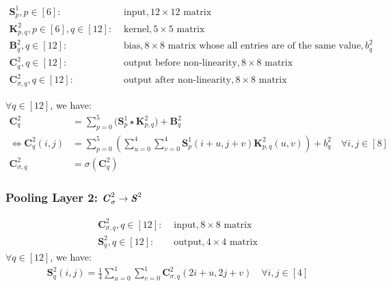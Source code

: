 \documentclass[12pt]{article}
\begin{document}
\begin{align*}
    \bm{S}^1_p, p \in [6]:& \text{ input}, 12 \times 12 \text{ matrix}\\
    \bm{K}^2_{p, q}, p \in [6], q \in [12]:& \text{ kernel}, 5 \times 5 \text{ matrix}\\
    \bm{B}^2_q, q \in [12]:& \text{ bias}, 8 \times 8 \text{ matrix whose all entries are of the same value}, b^2_q\\
    \bm{C}^2_q, q \in [12]:& \text{ output before non-linearity}, 8 \times 8 \text{ matrix}\\
    \bm{C}^2_{\sigma, q}, q \in [12]:& \text{ output after non-linearity}, 8 \times 8 \text{ matrix}
\end{align*}

$\forall q \in [12]$, we have:
\begin{align*}
    \bm{C}^2_q &= \sum_{p = 0}^5\Big(\bm{S}^1_p \star  \bm{K}^2_{p, q}\Big) + \bm{B}^2_q\\
    \Leftrightarrow \bm{C}^2_q(i, j) &= \sum_{p = 0}^5\left(\sum_{u = 0}^4\sum_{v = 0}^4\bm{S}^1_p(i + u, j + v)\bm{K}^2_{p, q}(u, v)\right) + b^2_q \quad \forall i, j \in [8]\\
    \bm{C}^2_{\sigma, q} &= \sigma(\bm{C}^2_q)
\end{align*}

\subsubsection{Pooling Layer 2: $\textbf{\textit{C}}^2_\sigma \rightarrow \textbf{\textit{S}}^2$}
\begin{align*}
    \bm{C}^2_{\sigma, q}, q \in [12]:& \text{ input}, 8 \times 8 \text{ matrix}\\
    \bm{S}^2_q, q \in [12]:& \text{ output}, 4 \times 4 \text{ matrix}
\end{align*}
$\forall q \in [12]$, we have:
\begin{align*}
    \bm{S}^2_q(i, j) = \frac{1}{4}\sum_{u = 0}^1\sum_{v = 0}^1\bm{C}^2_{\sigma, q}(2i + u, 2j + v) \quad \forall i, j \in [4]
\end{align*}
\end{document}
